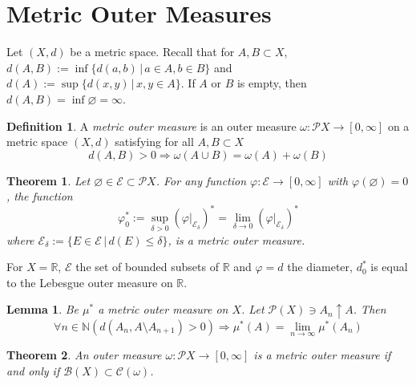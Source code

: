 \documentclass[11pt, a4paper, openany]{book}
\newtheorem{thm}{Theorem}\newtheorem{lem}{Lemma}\newtheorem{crl}{Corollary}
\theoremstyle{definition}
\newtheorem{define}{Definition}\newtheorem{exam}{Example}\newtheorem{remark}{Remark}
\DeclareMathOperator{\diam}{diam}
\begin{document}
\section{Metric Outer Measures}
    Let $(X,d)$ be a metric space. Recall that for $A,B\subset X$, $d(A,B):=\inf\{d(a,b)\,|\,a\in A,b\in B\}$ and $d(A):=\sup\{d(x,y)\,|\,x,y\in A\}$. If $A$ or $B$ is empty, then $d(A,B)=\inf \varnothing=\infty$.
    \begin{define}
        A \textit{metric outer measure} is an outer measure $\omega:\mathscr{P}X\rightarrow [0,\infty]$ on a metric space $(X,d)$ satisfying for all $A,B\subset X$
        \[d(A,B)>0\Longrightarrow \omega(A\cup B)=\omega(A)+\omega(B)\]
    \end{define}
    \begin{thm}
        Let $\varnothing\in\mathscr{E}\subset\mathscr{P}X$. For any function $\varphi:\mathscr{E}\rightarrow [0,\infty]$ with $\varphi(\varnothing)=0$, the function
        \[{\varphi^*_0}:=\sup_{\delta>0}(\varphi|_{\mathscr{E}_\delta})^*=\lim_{\delta\to 0}(\varphi|_{\mathscr{E}_\delta})^*\]
        where $\mathscr{E}_\delta:=\{E\in\mathscr{E}\,|\,d (E)\leqslant\delta\}$, is a metric outer measure.
    \end{thm}
    For $X=\mathbb{R}$, $\mathscr{E}$ the set of bounded subsets of $\mathbb{R}$ and $\varphi=d$ the diameter, $d^*_0$ is equal to the Lebesgue outer measure on $\mathbb{R}$.
    \begin{lem}
        Be $\mu^*$ a metric outer measure on $X$. Let $\mathscr{P}(X)\ni A_n\uparrow A$. Then
        \[\forall n\in\mathbb{N}(d(A_n,A\setminus A_{n+1})>0)\Longrightarrow \mu^*(A)=\lim_{n\to\infty}\mu^*(A_n)\]
    \end{lem}
    \begin{thm}
        An outer measure $\omega:\mathscr{P}X\rightarrow [0,\infty]$ is a metric outer measure if and only if $\mathscr{B}(X)\subset \mathscr{C}(\omega)$.
    \end{thm}
\end{document}
